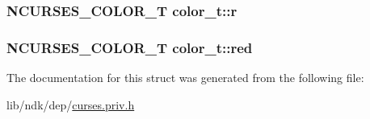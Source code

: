 \hypertarget{structcolor__t_aa92f8c6b3f25c127afcaee60fe292c41}{
\subsubsection[{r}]{\setlength{\rightskip}{0pt plus 5cm}N\-C\-U\-R\-S\-E\-S\-\_\-\-C\-O\-L\-O\-R\-\_\-\-T color\-\_\-t\-::r}}\label{structcolor__t_aa92f8c6b3f25c127afcaee60fe292c41}
\hypertarget{structcolor__t_a6f58df21ac1ed99e59d7afd8de05e062}{
\subsubsection[{red}]{\setlength{\rightskip}{0pt plus 5cm}N\-C\-U\-R\-S\-E\-S\-\_\-\-C\-O\-L\-O\-R\-\_\-\-T color\-\_\-t\-::red}}\label{structcolor__t_a6f58df21ac1ed99e59d7afd8de05e062}


The documentation for this struct was generated from the following file\-:\begin{DoxyCompactItemize}
\item 
lib/ndk/dep/\hyperlink{curses_8priv_8h}{curses.\-priv.\-h}\end{DoxyCompactItemize}
